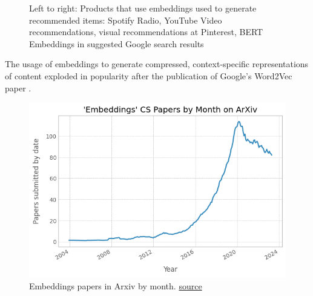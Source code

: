 \documentclass[11pt, table]{diazessay} %
\begin{document}
\begin{sloppypar}
\begin{figure}[H]
\caption{Left to right: Products that use embeddings used to generate recommended items: Spotify Radio, YouTube Video recommendations, visual recommendations at Pinterest, BERT Embeddings in suggested Google search results}
\end{figure}

The usage of embeddings to generate compressed, context-specific representations of content exploded in popularity after the publication of Google’s Word2Vec paper \citep{mikolov2013efficient}.

\begin{figure}[H]
\centering
\includegraphics[width=\linewidth]{figures/embeddings_1.png}
\caption{Embeddings papers in Arxiv by month. \href{https://github.com/veekaybee/embeddings_code/blob/main/fig_2_embeddings_papers.ipynb}{source}}
\end{figure}


\end{sloppypar}
\end{document}
